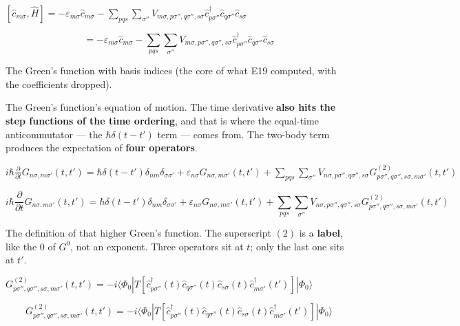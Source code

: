 \documentclass[dvipdfmx]{article}
\begin{document}
$[\hat c_{m\sigma}, \hat H] = -\varepsilon_{m\sigma}\hat c_{m\sigma} - \sum_{p q s}\sum_{\sigma''} V_{m\sigma,p\sigma'',q\sigma'',s\sigma} \hat c^\dagger_{p\sigma''} \hat c_{q\sigma''} \hat c_{s\sigma}$

\begin{equation}
  [\hat c_{m\sigma}, \hat H] = -\varepsilon_{m\sigma}\hat c_{m\sigma} - \sum_{p q s}\sum_{\sigma''} V_{m\sigma,p\sigma'',q\sigma'',s\sigma} \hat c^\dagger_{p\sigma''} \hat c_{q\sigma''} \hat c_{s\sigma}
  \label{eq:E23}
\end{equation}

The Green's function with basis indices (the core of what E19 computed, with the coefficients dropped).

The Green's function's equation of motion. The time derivative \textbf{also hits the step functions of the time ordering}, and that is where the equal-time anticommutator — the $\hbar\delta(t-t')$ term — comes from. The two-body term produces the expectation of \textbf{four operators}.

$i\hbar \frac{\partial}{\partial t} G_{n\sigma,m\sigma'}(t,t') = \hbar\delta(t-t')\delta_{nm}\delta_{\sigma\sigma'} + \varepsilon_{n\sigma} G_{n\sigma,m\sigma'}(t,t') + \sum_{p q s}\sum_{\sigma''} V_{n\sigma,p\sigma'',q\sigma'',s\sigma} G^{(2)}_{p\sigma'',q\sigma'',s\sigma,m\sigma'}(t,t')$

\begin{equation}
  i\hbar \frac{\partial}{\partial t} G_{n\sigma,m\sigma'}(t,t') = \hbar\delta(t-t')\delta_{nm}\delta_{\sigma\sigma'} + \varepsilon_{n\sigma} G_{n\sigma,m\sigma'}(t,t') + \sum_{p q s}\sum_{\sigma''} V_{n\sigma,p\sigma'',q\sigma'',s\sigma} G^{(2)}_{p\sigma'',q\sigma'',s\sigma,m\sigma'}(t,t')
  \label{eq:E24}
\end{equation}

The definition of that higher Green's function. The superscript $(2)$ is a \textbf{label}, like the $0$ of $G^0$, not an exponent. Three operators sit at $t$; only the last one sits at $t'$.

$G^{(2)}_{p\sigma'',q\sigma'',s\sigma,m\sigma'}(t,t') = -i\langle\Phi_0| T[\hat c^\dagger_{p\sigma''}(t) \hat c_{q\sigma''}(t) \hat c_{s\sigma}(t) \hat c^\dagger_{m\sigma'}(t')]|\Phi_0\rangle$

\begin{equation}
  G^{(2)}_{p\sigma'',q\sigma'',s\sigma,m\sigma'}(t,t') = -i\langle\Phi_0| T[\hat c^\dagger_{p\sigma''}(t) \hat c_{q\sigma''}(t) \hat c_{s\sigma}(t) \hat c^\dagger_{m\sigma'}(t')]|\Phi_0\rangle
  \label{eq:E25}
\end{equation}
\end{document}
